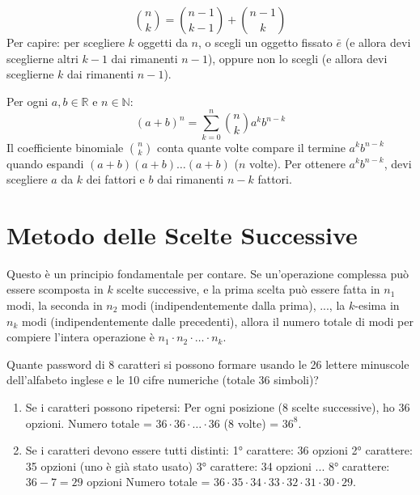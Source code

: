 \begin{theorem}
$$ \binom{n}{k} = \binom{n-1}{k-1} + \binom{n-1}{k} $$
Per capire: per scegliere $k$ oggetti da $n$, o scegli un oggetto fissato $\bar{e}$ (e allora devi sceglierne altri $k-1$ dai rimanenti $n-1$), oppure non lo scegli (e allora devi sceglierne $k$ dai rimanenti $n-1$).
\end{theorem}

\begin{theorem}
Per ogni $a, b \in \mathbb{R}$ e $n \in \mathbb{N}$:
$$ (a+b)^n = \sum_{k=0}^{n} \binom{n}{k} a^k b^{n-k} $$
Il coefficiente binomiale $\binom{n}{k}$ conta quante volte compare il termine $a^k b^{n-k}$ quando espandi $(a+b)(a+b)\dots(a+b)$ ($n$ volte). Per ottenere $a^k b^{n-k}$, devi scegliere $a$ da $k$ dei fattori e $b$ dai rimanenti $n-k$ fattori.
\end{theorem}

\section{Metodo delle Scelte Successive}
Questo è un principio fondamentale per contare.
Se un'operazione complessa può essere scomposta in $k$ scelte successive, e la prima scelta può essere fatta in $n_1$ modi, la seconda in $n_2$ modi (indipendentemente dalla prima), ..., la $k$-esima in $n_k$ modi (indipendentemente dalle precedenti), allora il numero totale di modi per compiere l'intera operazione è $n_1 \cdot n_2 \cdot \dots \cdot n_k$.

\begin{example}[Password]
Quante password di 8 caratteri si possono formare usando le 26 lettere minuscole dell'alfabeto inglese e le 10 cifre numeriche (totale 36 simboli)?
\begin{enumerate}
    \item Se i caratteri possono ripetersi:
    Per ogni posizione (8 scelte successive), ho 36 opzioni.
    Numero totale = $36 \cdot 36 \cdot \dots \cdot 36$ (8 volte) = $36^8$.
    \item Se i caratteri devono essere tutti distinti:
    1° carattere: 36 opzioni
    2° carattere: 35 opzioni (uno è già stato usato)
    3° carattere: 34 opzioni
    ...
    8° carattere: $36-7 = 29$ opzioni
    Numero totale = $36 \cdot 35 \cdot 34 \cdot 33 \cdot 32 \cdot 31 \cdot 30 \cdot 29$.
\end{enumerate}
\end{example}

